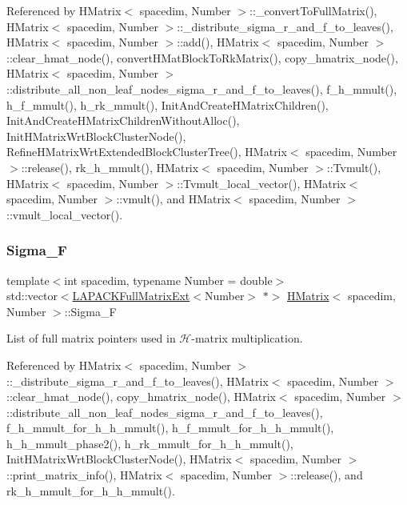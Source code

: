Referenced by H\+Matrix$<$ spacedim, Number $>$\+::\+\_\+convert\+To\+Full\+Matrix(), H\+Matrix$<$ spacedim, Number $>$\+::\+\_\+distribute\+\_\+sigma\+\_\+r\+\_\+and\+\_\+f\+\_\+to\+\_\+leaves(), H\+Matrix$<$ spacedim, Number $>$\+::add(), H\+Matrix$<$ spacedim, Number $>$\+::clear\+\_\+hmat\+\_\+node(), convert\+H\+Mat\+Block\+To\+Rk\+Matrix(), copy\+\_\+hmatrix\+\_\+node(), H\+Matrix$<$ spacedim, Number $>$\+::distribute\+\_\+all\+\_\+non\+\_\+leaf\+\_\+nodes\+\_\+sigma\+\_\+r\+\_\+and\+\_\+f\+\_\+to\+\_\+leaves(), f\+\_\+h\+\_\+mmult(), h\+\_\+f\+\_\+mmult(), h\+\_\+rk\+\_\+mmult(), Init\+And\+Create\+H\+Matrix\+Children(), Init\+And\+Create\+H\+Matrix\+Children\+Without\+Alloc(), Init\+H\+Matrix\+Wrt\+Block\+Cluster\+Node(), Refine\+H\+Matrix\+Wrt\+Extended\+Block\+Cluster\+Tree(), H\+Matrix$<$ spacedim, Number $>$\+::release(), rk\+\_\+h\+\_\+mmult(), H\+Matrix$<$ spacedim, Number $>$\+::\+Tvmult(), H\+Matrix$<$ spacedim, Number $>$\+::\+Tvmult\+\_\+local\+\_\+vector(), H\+Matrix$<$ spacedim, Number $>$\+::vmult(), and H\+Matrix$<$ spacedim, Number $>$\+::vmult\+\_\+local\+\_\+vector().

\mbox{\label{classHMatrix_aa659b6df63d533432ec1a24435cd9c40}} 
\subsubsection{\texorpdfstring{Sigma\+\_\+F}{Sigma\_F}}
{\footnotesize\ttfamily template$<$int spacedim, typename Number = double$>$ \\
std\+::vector$<$\hyperlink{classLAPACKFullMatrixExt}{L\+A\+P\+A\+C\+K\+Full\+Matrix\+Ext}$<$Number$>$ $\ast$$>$ \hyperlink{classHMatrix}{H\+Matrix}$<$ spacedim, Number $>$\+::Sigma\+\_\+F\hspace{0.3cm}{\ttfamily [private]}}

List of full matrix pointers used in $\mathcal{H}$-\/matrix multiplication. 

Referenced by H\+Matrix$<$ spacedim, Number $>$\+::\+\_\+distribute\+\_\+sigma\+\_\+r\+\_\+and\+\_\+f\+\_\+to\+\_\+leaves(), H\+Matrix$<$ spacedim, Number $>$\+::clear\+\_\+hmat\+\_\+node(), copy\+\_\+hmatrix\+\_\+node(), H\+Matrix$<$ spacedim, Number $>$\+::distribute\+\_\+all\+\_\+non\+\_\+leaf\+\_\+nodes\+\_\+sigma\+\_\+r\+\_\+and\+\_\+f\+\_\+to\+\_\+leaves(), f\+\_\+h\+\_\+mmult\+\_\+for\+\_\+h\+\_\+h\+\_\+mmult(), h\+\_\+f\+\_\+mmult\+\_\+for\+\_\+h\+\_\+h\+\_\+mmult(), h\+\_\+h\+\_\+mmult\+\_\+phase2(), h\+\_\+rk\+\_\+mmult\+\_\+for\+\_\+h\+\_\+h\+\_\+mmult(), Init\+H\+Matrix\+Wrt\+Block\+Cluster\+Node(), H\+Matrix$<$ spacedim, Number $>$\+::print\+\_\+matrix\+\_\+info(), H\+Matrix$<$ spacedim, Number $>$\+::release(), and rk\+\_\+h\+\_\+mmult\+\_\+for\+\_\+h\+\_\+h\+\_\+mmult().

